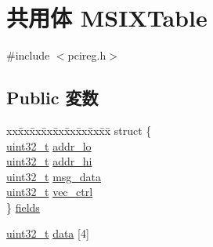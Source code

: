 \hypertarget{unionMSIXTable}{
\section{共用体 MSIXTable}
\label{unionMSIXTable}
}


{\ttfamily \#include $<$pcireg.h$>$}\subsection*{Public 変数}
\begin{DoxyCompactItemize}
\item 
\begin{tabbing}
xx\=xx\=xx\=xx\=xx\=xx\=xx\=xx\=xx\=\kill
struct \{\\
\>\hyperlink{Type_8hh_a435d1572bf3f880d55459d9805097f62}{uint32\_t} \hyperlink{unionMSIXTable_a12565d96544eb26893006f674959b08a}{addr\_lo}\\
\>\hyperlink{Type_8hh_a435d1572bf3f880d55459d9805097f62}{uint32\_t} \hyperlink{unionMSIXTable_a0d084c842a04378b2848b82de24f1949}{addr\_hi}\\
\>\hyperlink{Type_8hh_a435d1572bf3f880d55459d9805097f62}{uint32\_t} \hyperlink{unionMSIXTable_a9eac0dc114707ee8b932c89b5d5ca68f}{msg\_data}\\
\>\hyperlink{Type_8hh_a435d1572bf3f880d55459d9805097f62}{uint32\_t} \hyperlink{unionMSIXTable_ad014237a9bbb8e5880e4f52e909c272c}{vec\_ctrl}\\
\} \hyperlink{unionMSIXTable_a0b20e1c936db55ce0cf40c9537fff4cf}{fields}\\

\end{tabbing}\item 
\hyperlink{Type_8hh_a435d1572bf3f880d55459d9805097f62}{uint32\_\-t} \hyperlink{unionMSIXTable_aba3ab3dadf10b1a00fa5fc4ee3857cf6}{data} \mbox{[}4\mbox{]}
\end{DoxyCompactItemize}


